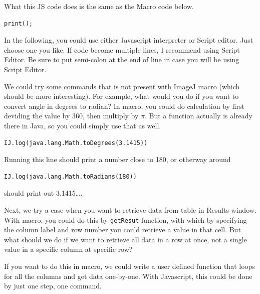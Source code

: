 \documentclass[11pt,a4paper,oneside]{report}
\newcommand{\ilcom}[1]{\texttt{\small#1}}
\begin{document}
What this JS code does is the same as the Macro code below. 
\begin{lstlisting}[numbers=none]
print();
\end{lstlisting}

In the following, you could use either Javascript interpreter or Script editor. Just choose one you like. If code become multiple lines, I recommend using Script Editor. Be sure to put semi-colon at the end of line in case you will be using Script Editor. 

We could try some commands that is not present with ImageJ macro (which should be more interesting). For example, what would you do if you want to convert angle in degrees to radian? In macro, you could do calculation by first deviding the value by 360, then multiply by $\pi$. But a function actually is already there in Java, so you could simply use that as well. 
\begin{lstlisting}[numbers=none]
IJ.log(java.lang.Math.toDegrees(3.1415)) 
\end{lstlisting}
Running this line should print a number close to 180, or otherway around
\begin{lstlisting}[numbers=none]
IJ.log(java.lang.Math.toRadians(180)) 
\end{lstlisting}
should print out 3.1415\dots.

Next, we try a case when you want to retrieve data from table in Results window. With macro, you could do this by \ilcom{getResut} function, with which by specifying the column label and row number you could retrieve a value in that cell. But what should we do if we want to retrieve all data in a row at once, not a single value in a specific column at specific row? 

If you want to do this in macro, we could write a user defined function that loops for all the columns and get data one-by-one. With Javascript, this could be done by just one step, one command. 
\end{document}
